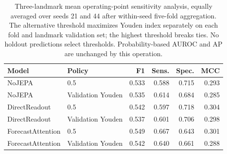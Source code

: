 \begin{table}[t]
\centering
\small
\caption{Three-landmark mean operating-point sensitivity analysis, equally averaged over seeds 21 and 44 after within-seed five-fold aggregation. The alternative threshold maximizes Youden index separately on each fold and landmark validation set; the highest threshold breaks ties. No holdout predictions select thresholds. Probability-based AUROC and AP are unchanged by this operation.}
\label{tab:extended_threshold}
\begin{tabular}{llrrrr}
\toprule
Model & Policy & F1 & Sens. & Spec. & MCC \\
\midrule
NoJEPA & 0.5 & 0.533 & 0.588 & 0.715 & 0.293 \\
NoJEPA & Validation Youden & 0.535 & 0.614 & 0.684 & 0.285 \\
\midrule
DirectReadout & 0.5 & 0.542 & 0.597 & 0.718 & 0.304 \\
DirectReadout & Validation Youden & 0.537 & 0.601 & 0.706 & 0.298 \\
\midrule
ForecastAttention & 0.5 & 0.549 & 0.667 & 0.643 & 0.301 \\
ForecastAttention & Validation Youden & 0.542 & 0.640 & 0.661 & 0.288 \\
\bottomrule
\end{tabular}
\end{table}
